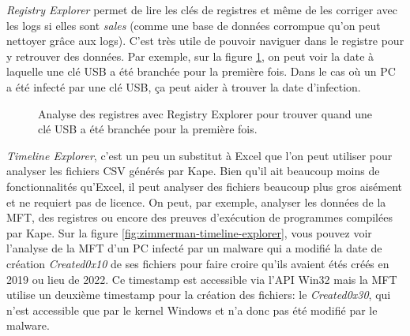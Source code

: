 \textit{Registry Explorer} permet de lire les clés de registres et même de les corriger avec les logs si elles sont \textit{sales} (comme une base de données corrompue qu'on peut nettoyer grâce aux logs). C'est très utile de pouvoir naviguer dans le registre pour y retrouver des données. Par exemple, sur la figure \ref{fig:zimmerman-registry-explorer}, on peut voir la date à laquelle une clé USB a été branchée pour la première fois. Dans le cas où un PC a été infecté par une clé USB, ça peut aider à trouver la date d'infection.

\begin{figure}
    \centering
    \caption{Analyse des registres avec Registry Explorer pour trouver quand une clé USB a été branchée pour la première fois.}
    \label{fig:zimmerman-registry-explorer}
\end{figure}

\textit{Timeline Explorer}, c'est un peu un substitut à Excel que l'on peut utiliser pour analyser les fichiers CSV générés par Kape. Bien qu'il ait beaucoup moins de fonctionnalités qu'Excel, il peut analyser des fichiers beaucoup plus gros aisément et ne requiert pas de licence. On peut, par exemple, analyser les données de la MFT, des registres ou encore des preuves d'exécution de programmes compilées par Kape. Sur la figure \ref{fig:zimmerman-timeline-explorer}, vous pouvez voir l'analyse de la MFT d'un PC infecté par un malware qui a modifié la date de création \textit{Created0x10} de ses fichiers pour faire croire qu'ils avaient étés créés en 2019 ou lieu de 2022. Ce timestamp est accessible via l'API Win32 mais la MFT utilise un deuxième timestamp pour la création des fichiers: le \textit{Created0x30}, qui n'est accessible que par le kernel Windows et n'a donc pas été modifié par le malware.

